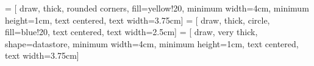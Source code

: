 \makeatletter
{}
\makeatother


 = [
    draw,
    thick,
    rounded corners,
    fill=yellow!20,
    minimum width=4cm, 
    minimum height=1cm,
    text centered, 
    text width=3.75cm]
 = [
    draw,
    thick,
    circle,
    fill=blue!20,
    text centered, 
    text width=2.5cm]
 = [
    draw,
    very thick,
    shape=datastore,
    minimum width=4cm, 
    minimum height=1cm,
    text centered, 
    text width=3.75cm]

